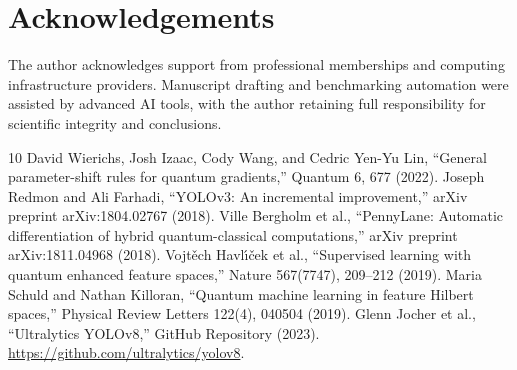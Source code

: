 \documentclass[10pt,twocolumn,letterpaper]{article}
\begin{document}
\section{Acknowledgements}

The author acknowledges support from professional memberships and computing infrastructure providers. Manuscript drafting and benchmarking automation were assisted by advanced AI tools, with the author retaining full responsibility for scientific integrity and conclusions.

\begin{thebibliography}{10}
 David Wierichs, Josh Izaac, Cody Wang, and Cedric Yen-Yu Lin, ``General parameter-shift rules for quantum gradients,'' Quantum 6, 677 (2022).
 Joseph Redmon and Ali Farhadi, ``YOLOv3: An incremental improvement,'' arXiv preprint arXiv:1804.02767 (2018).
 Ville Bergholm et al., ``PennyLane: Automatic differentiation of hybrid quantum-classical computations,'' arXiv preprint arXiv:1811.04968 (2018).
 Vojt\v{e}ch Havl\'{\i}\v{c}ek et al., ``Supervised learning with quantum enhanced feature spaces,'' Nature 567(7747), 209--212 (2019).
 Maria Schuld and Nathan Killoran, ``Quantum machine learning in feature Hilbert spaces,'' Physical Review Letters 122(4), 040504 (2019).
 Glenn Jocher et al., ``Ultralytics YOLOv8,'' GitHub Repository (2023). \url{https://github.com/ultralytics/yolov8}.
\end{thebibliography}
\end{document}
